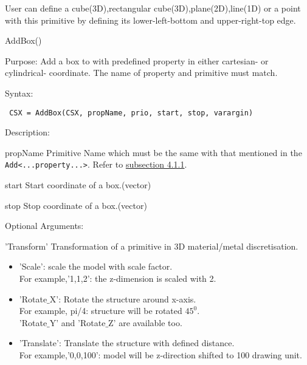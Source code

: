 User can define a cube(3D),rectangular cube(3D),plane(2D),line(1D) or a point with this primitive by defining its lower-left-bottom and upper-right-top edge.

\begin{FontNameFunct}{AddBox()}
\end{FontNameFunct} 

\begin{FontDescr}{Purpose:}
Add a box to \label{CSX} with predefined property in either cartesian- or cylindrical- coordinate. The name of property and primitive must match.  
\end{FontDescr}

\begin{FontDescr}{Syntax:}
\begin{lstlisting} 
 CSX = AddBox(CSX, propName, prio, start, stop, varargin)
\end{lstlisting}
\end{FontDescr}

\begin{FontDescr}{Description:}

\begin{FontPara}{propName}  \label{prim_Name}
Primitive Name which must be the same with that mentioned in the \texttt{Add<...property...>}. Refer to \hyperref[subsection_gprop_setup]{subsection 4.1.1}.
\end{FontPara}

\begin{FontPara}{start}
Start coordinate of a box.(vector)
\end{FontPara}

\begin{FontPara}{stop}
Stop coordinate of a box.(vector)
\end{FontPara}

\end{FontDescr}

\begin{FontDescr}{Optional Arguments:}  \label{primtransform}
\begin{FontPara}{'Transform'}
Transformation of a primitive in 3D material/metal discretisation.
\begin{itemize}
\item\textcolor{varcol}{'Scale'}: scale the model with scale factor.\\ For example,'1,1,2': the z-dimension is scaled with 2. 

\item\textcolor{varcol}{'Rotate$\_$X'}:  Rotate the structure around x-axis.\\ For example, pi/4: structure will be rotated $45^{0}$. \\'Rotate$\_$Y' and 'Rotate$\_$Z' are available too.  

\item\textcolor{varcol}{'Translate'}: Translate the structure with defined distance.\\For example,'0,0,100': model will be z-direction shifted to 100 drawing unit.
\end{itemize}
\end{FontPara}
\end{FontDescr}

